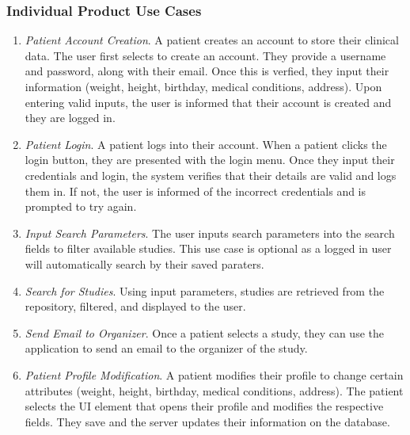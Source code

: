 \documentclass[12pt, titlepage]{article}
\begin{document}
\subsubsection{Individual Product Use Cases}

\begin{enumerate}

\item \textit{Patient Account Creation}. A patient creates an account to store their clinical data. The user first selects to create an account. They provide a username and password, along with their email. Once this is verfied, they input their information (weight, height, birthday, medical conditions, address). Upon entering valid inputs, the user is informed that their account is created and they are logged in.

\item \textit{Patient Login}. A patient logs into their account. When a patient clicks the login button, they are presented with the login menu. Once they input their credentials and login, the system verifies that their details are valid and logs them in. If not, the user is informed of the incorrect credentials and is prompted to try again.

\item \textit{Input Search Parameters}. The user inputs search parameters into the search fields to filter available studies. This use case is optional as a logged in user will automatically search by their saved paraters.

\item \textit{Search for Studies}. Using input parameters, studies are retrieved from the repository, filtered, and displayed to the user. 

\item \textit{Send Email to Organizer}. Once a patient selects a study, they can use the application to send an email to the organizer of the study.

\item \textit{Patient Profile Modification}. A patient modifies their profile to change certain attributes (weight, height, birthday, medical conditions, address). The patient selects the UI element that opens their profile and modifies the respective fields. They save and the server updates their information on the database. 


\end{enumerate}
\end{document}
